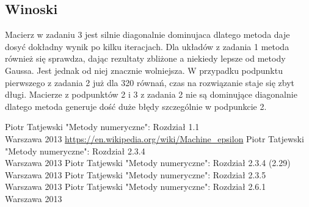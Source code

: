\documentclass[a4paper, 11pt]{article}
\begin{document}
\subsection{Winoski}
Macierz w zadaniu 3 jest silnie diagonalnie dominujaca dlatego metoda daje dosyć dokładny wynik po kilku iteracjach. Dla układów z zadania 1 metoda również się sprawdza, dając rezultaty zbliżone a niekiedy lepsze od metody Gaussa. Jest jednak od niej znacznie wolniejsza. W przypadku podpunktu pierwszego z zadania 2 już dla 320 równań, czas na rozwiązanie staje się zbyt długi. Macierze z podpunktów 2 i 3 z zadania 2 nie są dominujące diagonalnie dlatego metoda generuje dość duże błędy szczególnie w podpunkcie 2. 






\begin{thebibliography}{99}
 Piotr Tatjewski "Metody numeryczne": Rozdział 1.1\\
Warszawa 2013
\url{https://en.wikipedia.org/wiki/Machine_epsilon}
 Piotr Tatjewski "Metody numeryczne": Rozdział 2.3.4\\
Warszawa 2013
 Piotr Tatjewski "Metody numeryczne": Rozdział 2.3.4 (2.29)\\
Warszawa 2013
 Piotr Tatjewski "Metody numeryczne": Rozdział 2.3.5\\
Warszawa 2013
 Piotr Tatjewski "Metody numeryczne": Rozdział 2.6.1\\
Warszawa 2013
\end{thebibliography}










	
\end{document}
